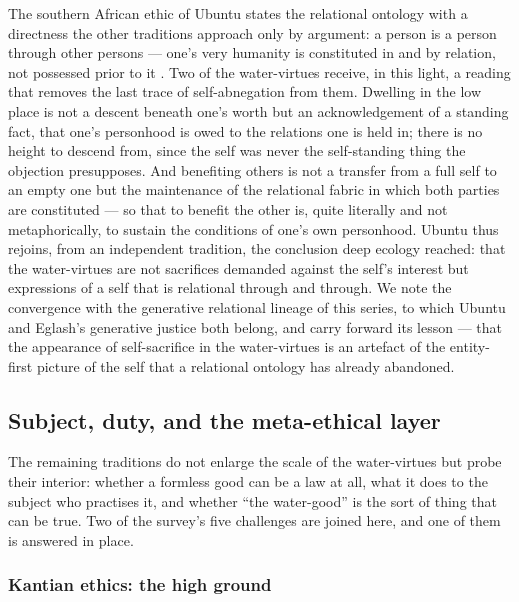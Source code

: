 The southern African ethic of Ubuntu states the relational ontology with a directness the other traditions approach only by argument: a person is a person through other persons --- one's very humanity is constituted in and by relation, not possessed prior to it \parencite{metz2011,mbiti1970}. Two of the water-virtues receive, in this light, a reading that removes the last trace of self-abnegation from them. Dwelling in the low place is not a descent beneath one's worth but an acknowledgement of a standing fact, that one's personhood is owed to the relations one is held in; there is no height to descend from, since the self was never the self-standing thing the objection presupposes. And benefiting others is not a transfer from a full self to an empty one but the maintenance of the relational fabric in which both parties are constituted --- so that to benefit the other is, quite literally and not metaphorically, to sustain the conditions of one's own personhood. Ubuntu thus rejoins, from an independent tradition, the conclusion deep ecology reached: that the water-virtues are not sacrifices demanded against the self's interest but expressions of a self that is relational through and through. We note the convergence with the generative relational lineage of this series, to which Ubuntu and Eglash's generative justice both belong, and carry forward its lesson --- that the appearance of self-sacrifice in the water-virtues is an artefact of the entity-first picture of the self that a relational ontology has already abandoned.


\subsection{Subject, duty, and the meta-ethical layer}
\label{p20:sub:review-subject}

The remaining traditions do not enlarge the scale of the water-virtues but probe their interior: whether a formless good can be a law at all, what it does to the subject who practises it, and whether ``the water-good'' is the sort of thing that can be true. Two of the survey's five challenges are joined here, and one of them is answered in place.

\subsubsection{Kantian ethics: the high ground}
\label{p20:ssub:review-kant}

